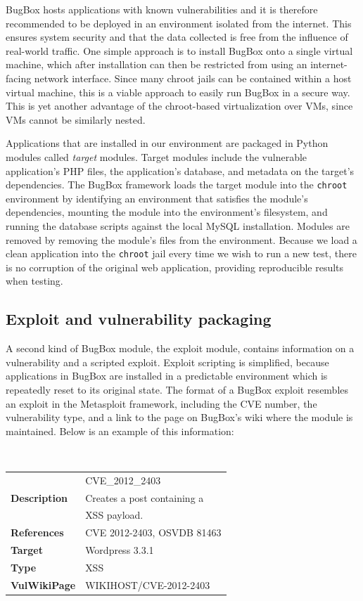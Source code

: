 \documentclass[letterpaper,twocolumn,10pt]{article}
\begin{document}
BugBox hosts applications with known vulnerabilities and it is therefore recommended to be deployed in an environment isolated from the internet. This ensures system security and that the data collected is free from the influence of real-world traffic. One simple approach is to install BugBox onto a single virtual machine, which after installation can then be restricted from using an internet-facing network interface. Since many chroot jails can be contained within a host virtual machine, this is a viable approach to easily run BugBox in a secure way. This is yet another advantage of the chroot-based virtualization over VMs, since VMs cannot be similarly nested.

Applications that are installed in our environment are packaged in Python modules called \textit{target} modules. Target modules include the vulnerable application's PHP files, the application's database, and metadata on the target's dependencies. The BugBox framework loads the target module into the \texttt{chroot} environment by identifying an environment that satisfies the module's dependencies, mounting the module into the environment's filesystem, and running the database scripts against the local MySQL installation. Modules are removed by removing the module's files from the environment. Because we load a clean application into the {\tt chroot} jail every time we wish to run a new test, there is no corruption of the original web application, providing reproducible results when testing.

\subsection{Exploit and vulnerability packaging}

A second kind of BugBox module, the exploit module, contains information on a vulnerability and a scripted exploit. Exploit scripting is simplified, because applications in BugBox are installed in a predictable environment which is repeatedly reset to its original state. The format of a BugBox exploit resembles an exploit in the Metasploit framework, including the CVE number, the vulnerability type, and a link to the page on BugBox's wiki where the module is maintained. Below is an example of this information:

\begin{minipage}{\textwidth}
{\tt \small
\begin{tabular} { l l }
\noindent{\bf Name}&CVE\_2012\_2403\\
{\bf Description}&Creates a post containing a\\& XSS payload.\\
{\bf References}&CVE 2012-2403, OSVDB 81463 \\
{\bf Target}&Wordpress 3.3.1\\
{\bf Type}&XSS\\
{\bf VulWikiPage}&WIKIHOST/CVE-2012-2403
\end{tabular}
}
\end{minipage}
\end{document}
